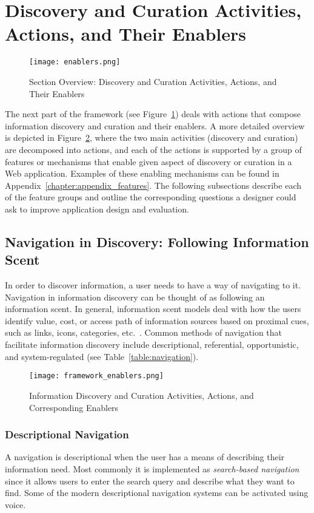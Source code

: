 {\section{Discovery and Curation Activities, Actions, and Their Enablers}
\label{section:enablers}

\begin{figure}[ht!]
	\noindent
	\centering
	\texttt{[image: enablers.png]}
	\caption{Section Overview: Discovery and Curation Activities, Actions, and Their Enablers}
	\label{fig:enablers_overview} 
\end{figure}
The next part of the framework (see Figure~\ref{fig:enablers_overview}) deals with actions that compose information discovery and curation and their enablers. A more detailed overview is depicted in Figure~\ref{fig:enablers}, where the two main activities (discovery and curation) are decomposed into actions, and each of the actions is supported by a group of features or mechanisms that enable given aspect of discovery or curation in a Web application. Examples of these enabling mechanisms can be found in Appendix~\ref{chapter:appendix_features}. The following subsections describe each of the feature groups and outline the corresponding questions a designer could ask to improve application design and evaluation.  

{\subsection{Navigation in Discovery: Following Information Scent}
In order to discover information, a user needs to have a way of navigating to it. Navigation in information discovery can be thought of as following an information scent. In general, information scent models deal with how the users identify value, cost, or access path of information sources based on proximal cues, such as links, icons, categories, etc.~\cite{pirolli1999information}. Common methods of navigation that facilitate information discovery include descriptional, referential, opportunistic, and system-regulated (see Table~\ref{table:navigation}). 

\begin{figure}[ht!]
	\noindent
	\centering
	\texttt{[image: framework\_enablers.png]}
	\caption{Information Discovery and Curation Activities, Actions, and Corresponding Enablers}
	\label{fig:enablers} 
\end{figure}
\clearpage

{\subsubsection{Descriptional Navigation}
A navigation is descriptional when the user has a means of describing their information need. Most commonly it is implemented as \textit{search-based navigation} since it allows users to enter the search query and describe what they want to find. Some of the modern descriptional navigation systems can be activated using voice. 

}}}
